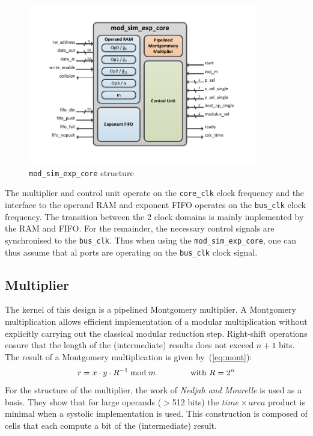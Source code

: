 \begin{figure}[H]
\centering
\includegraphics[trim=1.2cm 1.2cm 1.2cm 1.2cm, width=10cm]{pictures/mod_sim_exp_core.pdf}
\cprotect\caption{\verb|mod_sim_exp_core| structure}
\label{msec_structure}
\end{figure}

The multiplier and control unit operate on the \verb|core_clk| clock frequency and the interface to the operand RAM and
exponent FIFO operates on the \verb|bus_clk| clock frequency. The transition between the 2 clock domains is mainly
implemented by the RAM and FIFO. For the remainder, the necessary control signals are synchronised to the
\verb|bus_clk|. Thus when using the \verb|mod_sim_exp_core|, one can thus assume that al ports are operating on the
\verb|bus_clk| clock signal.

\subsection{Multiplier}
The kernel of this design is a pipelined Montgomery multiplier. A Montgomery multiplication\cite{MontModMul} allows efficient implementation of a
modular multiplication without explicitly carrying out the classical modular reduction step. Right-shift operations ensure that the length of the (intermediate) results does not exceed $n+1$ bits. The result of a Montgomery multiplication is given by~(\ref{eq:mont}):
\begin{align}\label{eq:mont}
r = x \cdot y \cdot R^{-1} \bmod m \hspace{1.5cm}\text{with } R = 2^{n}
\end{align}
For the structure of the multiplier, the work of \textit{Nedjah and Mourelle}\cite{NedMour} is used as a basis. They show that for large operands ($>$512 bits) the $time\times area$ product is minimal when a systolic implementation is used. This construction is composed of cells that each compute a bit of the (intermediate) result.

